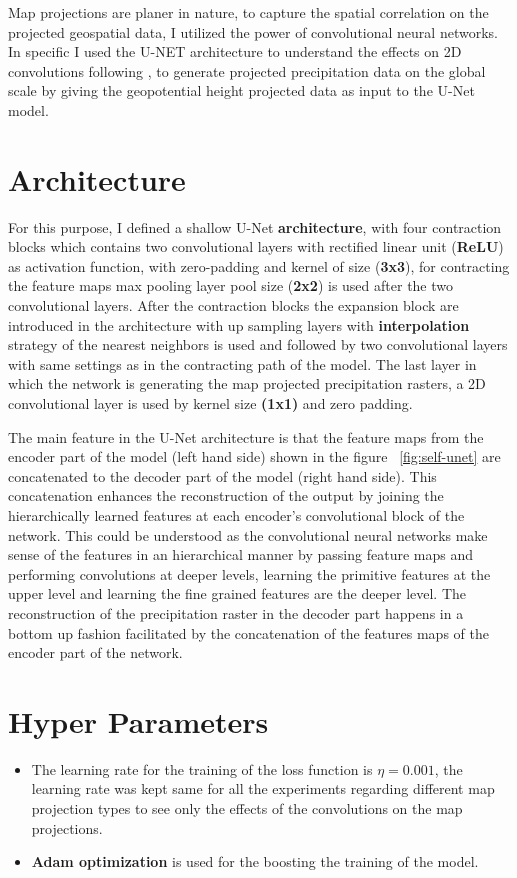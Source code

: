 Map projections are planer in nature, to capture the spatial correlation on the projected geospatial data, I utilized the power of convolutional neural networks.
In specific I used the U-NET \cite{ronneberger2015unet}  architecture to understand the effects on 2D convolutions following \cite{trebing2021smaatunet}, to generate projected precipitation data on the global scale by giving the geopotential height projected data as input to the U-Net model.

\section{Architecture}
For this purpose, I defined a shallow U-Net \textbf{architecture}, with four contraction blocks which contains two convolutional layers with rectified linear unit (\textbf{ReLU})
as activation function, with zero-padding and kernel of size (\textbf{3x3}), for contracting the feature maps max pooling layer pool size (\textbf{2x2}) is used after the two
convolutional layers.
After the contraction blocks the expansion block are introduced in the architecture with up sampling layers with \textbf{interpolation} strategy of the nearest neighbors is used
and followed by two convolutional layers with same settings as in the contracting path of the model.
The last layer in which the network is generating the map projected precipitation rasters, a 2D convolutional layer is used by kernel size  \textbf{(1x1)} and zero padding.

The main feature in the U-Net architecture is that the feature maps from the encoder part of the model (left hand side) shown in the figure ~\ref{fig:self-unet} are concatenated to the decoder part of the model (right hand side).
This concatenation enhances the reconstruction of the output by joining the hierarchically learned features at each encoder's convolutional block of the network. This could be
understood as the convolutional neural networks make sense of the features in an hierarchical manner by passing feature maps and performing convolutions at deeper levels,
learning the primitive features at the upper level and learning the fine grained features are the deeper level. The reconstruction of the precipitation raster in the decoder
part happens in a bottom up fashion facilitated by the concatenation of the features maps of the encoder part of the network.

\section{Hyper Parameters}
\begin{itemize}
    \item The learning rate for the training of the loss function is $\eta = 0.001$, the learning rate was kept same for all the experiments regarding different map projection types to see only the effects of the convolutions on the map projections.
    \item \textbf{Adam optimization} is used for the boosting the training of the model.
\end{itemize}

